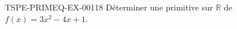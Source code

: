 \begin{exercice}{TSPE-PRIMEQ-EX-001}{1}{8}
Déterminer une primitive sur $\mathbb{R}$ de $f(x) = 3x^2 - 4x + 1$.
\end{exercice}
